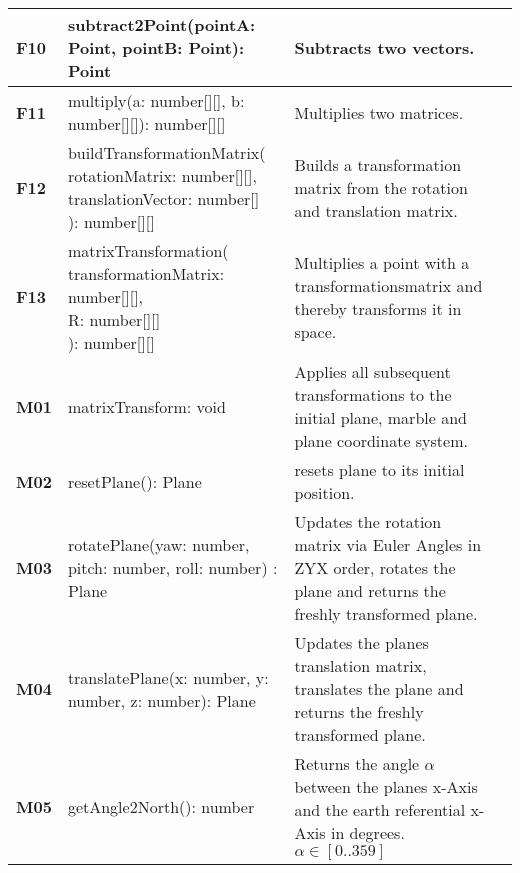 \begin{xltabular}{\textwidth}{|M{1.2cm}|X|X|M{3cm}|}
  \textbf{F10} & {\ttfamily subtract2Point(pointA: Point, pointB: Point): Point} & Subtracts two vectors. &  \\ \hline 
  \textbf{F11} & {\ttfamily multiply(a: number[][], b: number[][]): number[][]} & Multiplies two matrices. &  \\ \hline 
  \textbf{F12} & {\ttfamily buildTransformationMatrix( \newline rotationMatrix: number[][], \newline  translationVector: number[] \newline ): number[][]} & Builds a transformation matrix from the rotation and translation matrix. &  \\ \hline 
  \textbf{F13} & {\ttfamily matrixTransformation( \newline transformationMatrix: number[][], \newline R: number[][] \newline ): number[][]} & Multiplies a point with a transformationsmatrix and thereby transforms it in space. &  \\ \hline 
  \textbf{M01} & {\ttfamily matrixTransform: void } & Applies all subsequent transformations to the initial plane, marble and plane coordinate system. &  \\ \hline 
  \textbf{M02} & {\ttfamily resetPlane(): Plane } & resets plane to its initial position. &  \\ \hline 
  \textbf{M03} & {\ttfamily rotatePlane(yaw: number, pitch: number, roll: number) : Plane} & Updates the rotation matrix via Euler Angles in ZYX order, rotates the plane and returns the freshly transformed plane. &  \\ \hline 
  \textbf{M04} & {\ttfamily translatePlane(x: number, y: number, z: number): Plane} & Updates the planes translation matrix, translates the plane and returns the freshly transformed plane. &  \\ \hline 
  \textbf{M05} & {\ttfamily getAngle2North(): number} & Returns the angle $\alpha$ between the planes x-Axis and the earth referential x-Axis in degrees. $\alpha\in\left[0..359\right]$ &  \\ \hline 

\end{xltabular}
